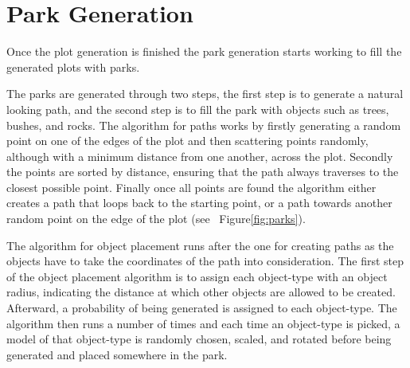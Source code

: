 \section{Park Generation}

Once the plot generation is finished the park generation starts working to fill the generated plots with parks.

The parks are generated through two steps, the first step is to generate a natural looking path, and the second step is to fill the park with objects such as trees, bushes, and rocks. 
The algorithm for paths works by firstly generating a random point on one of the edges of the plot and then scattering points randomly, although with a minimum distance from one another, across the plot. 
Secondly the points are sorted by distance, ensuring that the path always traverses to the closest possible point. 
Finally once all points are found the algorithm either creates a path that loops back to the starting point, or a path towards another random point on the edge of the plot (see ~Figure\ref{fig:parks}).

The algorithm for object placement runs after the one for creating paths as the objects have to take the coordinates of the path into consideration.
The first step of the object placement algorithm is to assign each object-type with an object radius, indicating the distance at which other objects are allowed to be created. 
Afterward, a probability of being generated is assigned to each object-type.
The algorithm then runs a number of times and each time an object-type is picked, a model of that object-type is randomly chosen, scaled, and rotated before being generated and placed somewhere in the park.


